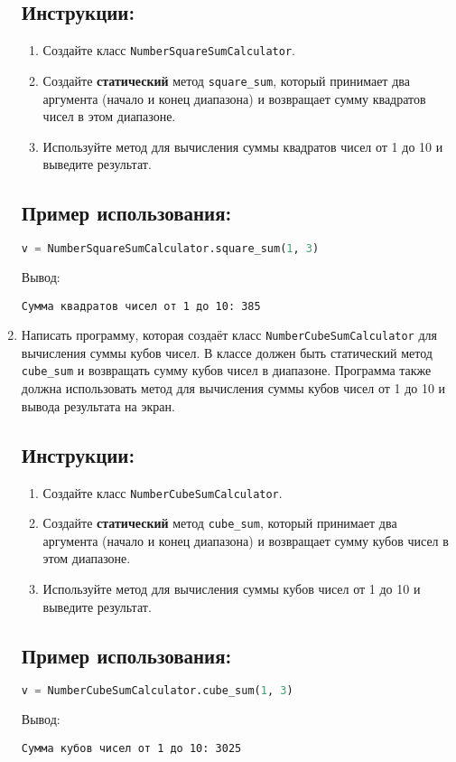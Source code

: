 \begin{enumerate}
\subsection*{Инструкции:}
\begin{enumerate}
    \item Создайте класс \texttt{NumberSquareSumCalculator}.
    \item Создайте \textbf{статический} метод \texttt{square\_sum}, который принимает два аргумента (начало и конец диапазона) и возвращает сумму квадратов чисел в этом диапазоне.
    \item Используйте метод для вычисления суммы квадратов чисел от 1 до 10 и выведите результат.
\end{enumerate}

\subsection*{Пример использования:}
\begin{lstlisting}[language=Python]
    v = NumberSquareSumCalculator.square_sum(1, 3)
\end{lstlisting}
Вывод:
\begin{verbatim}
Сумма квадратов чисел от 1 до 10: 385
\end{verbatim}

\item
Написать программу, которая создаёт класс \texttt{NumberCubeSumCalculator} 
для вычисления суммы кубов чисел. В классе должен быть статический метод
\texttt{cube\_sum} и возвращать сумму кубов чисел в диапазоне. 
Программа также должна использовать метод для вычисления суммы кубов чисел от 
1 до 10 и вывода результата на экран.

\subsection*{Инструкции:}
\begin{enumerate}
    \item Создайте класс \texttt{NumberCubeSumCalculator}.
    \item Создайте \textbf{статический} метод \texttt{cube\_sum}, который принимает два аргумента (начало и конец диапазона) и возвращает сумму кубов чисел в этом диапазоне.
    \item Используйте метод для вычисления суммы кубов чисел от 1 до 10 и выведите результат.
\end{enumerate}

\subsection*{Пример использования:}
\begin{lstlisting}[language=Python]
    v = NumberCubeSumCalculator.cube_sum(1, 3)
\end{lstlisting}
Вывод:
\begin{verbatim}
Сумма кубов чисел от 1 до 10: 3025
\end{verbatim}


\end{enumerate}
